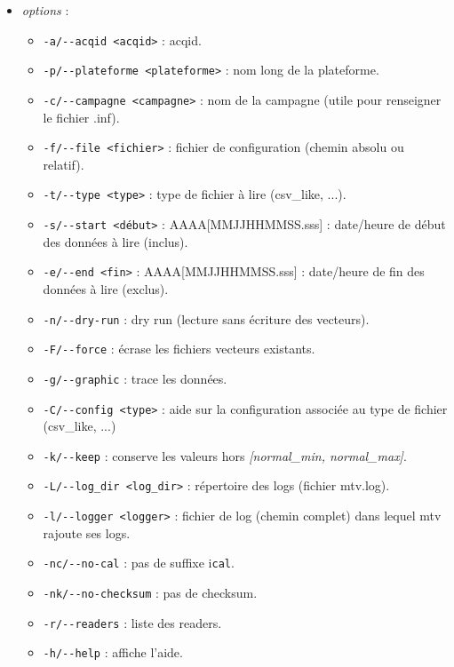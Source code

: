 \begin{itemize}
\medskip
\item[•] \textit{options} :
    \begin{itemize}
      \item[] \texttt{-a/{}-{}-acqid <acqid>}           : acqid.
      \item[] \texttt{-p/{}-{}-plateforme <plateforme>} : nom long de la plateforme.
      \item[] \texttt{-c/{}-{}-campagne <campagne>}     : nom de la campagne (utile pour renseigner le fichier .inf).
      \item[] \texttt{-f/{}-{}-file <fichier>}          : fichier de configuration (chemin absolu ou relatif).
      \item[] \texttt{-t/{}-{}-type <type>}             : type de fichier à lire (csv\_like, ...).
      \item[] \texttt{-s/{}-{}-start <début>}           : AAAA[MMJJHHMMSS.sss] : date/heure de début des données à lire (inclus).
      \item[] \texttt{-e/{}-{}-end <fin>}               : AAAA[MMJJHHMMSS.sss] : date/heure de fin des données à lire (exclus).
      \item[] \texttt{-n/{}-{}-dry-run}                 : dry run (lecture sans écriture des vecteurs).
      \item[] \texttt{-F/{}-{}-force}                   : écrase les fichiers vecteurs existants.
      \item[] \texttt{-g/{}-{}-graphic}                 : trace les données.
      \item[] \texttt{-C/{}-{}-config <type>}           : aide sur la configuration associée au type de fichier (csv\_like, ...)
      \item[] \texttt{-k/{}-{}-keep}                    : conserve les valeurs hors \textit{[normal\_min, normal\_max]}.
      \item[] \texttt{-L/{}-{}-log\_dir <log\_dir>}     : répertoire des logs (fichier mtv.log).
      \item[] \texttt{-l/{}-{}-logger <logger>}         : fichier de log (chemin complet) dans lequel mtv rajoute ses logs.
      \item[] \texttt{-nc/{}-{}-no-cal}                 : pas de suffixe i\texttt{cal}.
      \item[] \texttt{-nk/{}-{}-no-checksum}            : pas de checksum.
      \item[] \texttt{-r/{}-{}-readers}                 : liste des readers.
      \item[] \texttt{-h/{}-{}-help}                    : affiche l'aide.
    \end{itemize}
\end{itemize}

